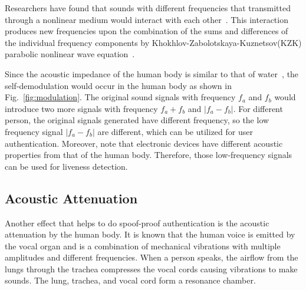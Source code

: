 Researchers have found that sounds with different frequencies that transmitted through a nonlinear medium would interact with each other~\cite{pompei1998use}. This interaction produces new frequencies upon the combination of the sums and differences of the individual frequency components by Khokhlov-Zabolotskaya-Kuznetsov(KZK) parabolic nonlinear wave equation~\cite{novikov1987nonlinear}. 

Since the acoustic impedance of the human body is similar to that of water~\cite{kim2014sound}, the self-demodulation would occur in the human body as shown in Fig.~\ref{fig:modulation}. 
The original sound signals with frequency $f_a$ and $f_b$ would introduce two more signals with frequency $f_a + f_b$ and $|f_a - f_b|$. For different person, the original signals generated have different frequency, so the low frequency signal $|f_a - f_b|$ are different, which can be utilized for user authentication.
%
Moreover, note that electronic devices have different acoustic properties from that of the human body. Therefore, those low-frequency signals can be used for liveness detection.


\subsection{Acoustic Attenuation}
Another effect that helps {\shortname} to do spoof-proof authentication is the acoustic attenuation by the human body.
%
It is known that the human voice is emitted by the vocal organ and is a combination of mechanical vibrations with multiple amplitudes and different frequencies.
%
When a person speaks, the airflow from the lungs through the trachea compresses the vocal cords causing vibrations to make sounds. The lung, trachea, and vocal cord form a resonance chamber. 


